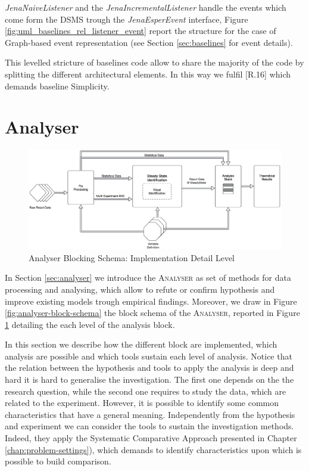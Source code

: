 \textit{JenaNaiveListener} and the  \textit{JenaIncrementalListener} handle the events which come form the DSMS trough the \textit{JenaEsperEvent} interface, Figure \ref{fig:uml_baselines_rel_listener_event} report  the structure for the case of Graph-based event representation (see Section \ref{sec:baselines} for event details). 

This levelled stricture of  baselines code allow to share the majority of the code by splitting the different architectural elements. In this way we fulfil [R.16] which demands baseline Simplicity.


\section{Analyser}\label{sec:analyser-impl}

\begin{figure}[tbh]
  \centering
	\includegraphics[width=\linewidth]{images/analyser-block-schema-impl}
	\caption{Analyser Blocking Schema: Implementation Detail Level} 
  	\label{fig:analyser-block-schema-impl}
\end{figure}

In Section \ref{sec:analyser} we introduce the \textsc{Analyser} as set of methods for data processing and analysing, which allow to refute or confirm hypothesis and improve existing models trough empirical findings. Moreover, we draw in Figure \ref{fig:analyser-block-schema} the block schema of the \textsc{Analyser}, reported in Figure \ref{fig:analyser-block-schema-impl} detailing the each level of the analysis block.

In this section we describe how the different block are implemented, which analysis are possible and which tools sustain each level of analysis.
Notice that the relation between the hypothesis and tools to apply the analysis is deep and hard it is hard to generalise the investigation. The first one depends on the the research question, while the second one requires to study the data, which are related to the experiment.  However, it is possible to identify some common characteristics that have a general meaning. Independently from the hypothesis and  experiment we can consider the tools to sustain the investigation methods. Indeed, they apply the Systematic Comparative Approach presented in Chapter \ref{chap:problem-settings}), which demands to identify characteristics upon which is possible to build comparison. 

